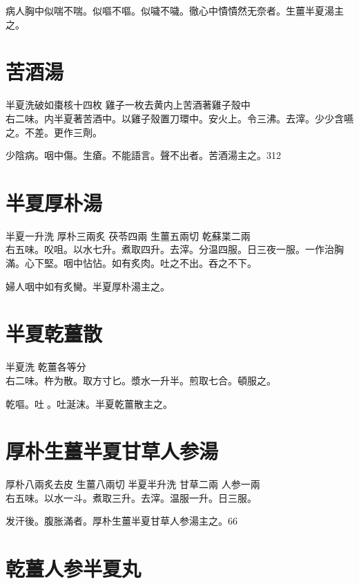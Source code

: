 病人胸中似喘不喘。似嘔不嘔。似噦不噦。徹心中憒憒然无奈者。生薑半夏湯主之。

\section{苦酒湯}

半夏{\scriptsize 洗破如棗核十四枚} 雞子{\scriptsize 一枚去黄内上苦酒著雞子殼中}\\
右二味。内半夏著苦酒中。以雞子殼置刀環中。安火上。令三沸。去滓。少少含嚥之。不差。更作三劑。

少陰病。咽中傷。生瘡。不能語言。聲不出者。苦酒湯主之。312

\section{半夏厚朴湯}

半夏{\scriptsize 一升洗} 厚朴{\scriptsize 三兩炙} 茯苓{\scriptsize 四兩} 生薑{\scriptsize 五兩切} 乾蘇枼{\scriptsize 二兩}\\
右五味。㕮咀。以水七升。煮取四升。去滓。分温四服。日三夜一服。{\scriptsize 一作治胸滿。心下堅。咽中怗怗。如有炙肉。吐之不出。吞之不下。}

婦人咽中如有炙臠。半夏厚朴湯主之。

\section{半夏乾薑散}

半夏{\scriptsize 洗} 乾薑{\scriptsize 各等分}\\
右二味。杵为散。取方寸匕。漿水一升半。煎取七合。頓服之。

乾嘔。吐{\sungtpii 𠱘}。吐涎沫。半夏乾薑散主之。

\section{厚朴生薑半夏甘草人参湯}

厚朴{\scriptsize 八兩炙去皮} 生薑{\scriptsize 八兩切} 半夏{\scriptsize 半升洗} 甘草{\scriptsize 二兩} 人参{\scriptsize 一兩}\\
右五味。以水一斗。煮取三升。去滓。温服一升。日三服。

发汗後。腹胀滿者。厚朴{\khaaitp 生薑半夏甘草人参}湯主之。66

\section{乾薑人参半夏丸}

